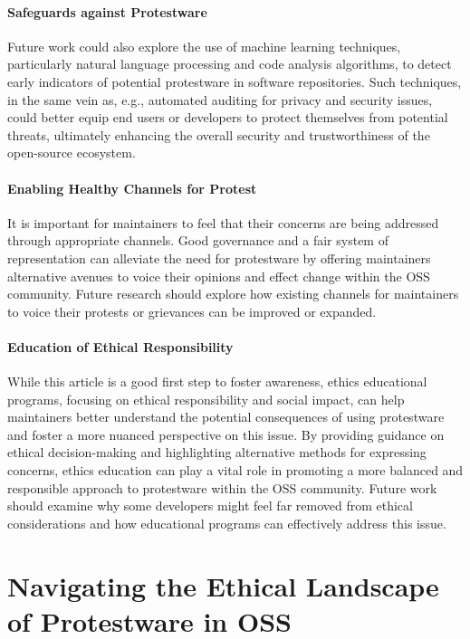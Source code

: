 \documentclass[journal,twocolumn]{IEEEtran}
\begin{document}
\paragraph{Safeguards against Protestware}
Future work could also explore the use of machine learning techniques, particularly natural language processing and code analysis algorithms, to detect early indicators of potential protestware in software repositories. Such techniques, in the same vein as, e.g., automated auditing for privacy and security issues,  could  better equip end users or developers to protect themselves from potential threats, ultimately enhancing the overall security and trustworthiness of the open-source ecosystem.

\paragraph{Enabling Healthy Channels for Protest}
It is important for maintainers to feel that their concerns are being addressed through appropriate channels. Good governance and a fair system of representation can alleviate the need for protestware by offering maintainers alternative avenues to voice their opinions and effect change within the OSS community. Future research should explore how existing channels for maintainers to voice their protests or grievances can be improved or expanded.

\paragraph{Education of Ethical Responsibility}
While this article is a good first step to foster awareness, ethics educational programs, focusing on ethical responsibility and social impact, can help maintainers better understand the potential consequences of using protestware and foster a more nuanced perspective on this issue. By providing guidance on ethical decision-making and highlighting alternative methods for expressing concerns, ethics education can play a vital role in promoting a more balanced and responsible approach to protestware within the OSS community. Future work should examine why some developers might feel far removed from ethical considerations and how educational programs can effectively address this issue.

\section{Navigating the Ethical Landscape of Protestware in OSS}
\end{document}

